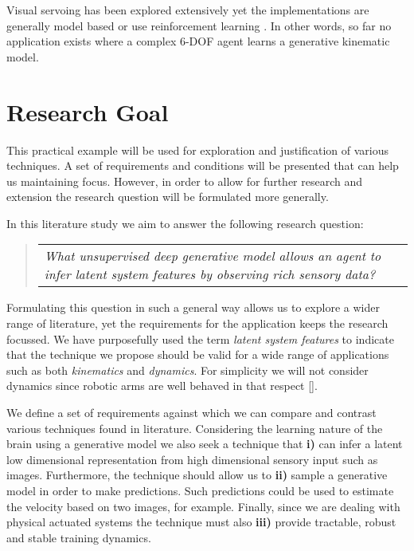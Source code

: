 \documentclass[main.tex]{subfiles}
\begin{document}
Visual servoing has been explored extensively yet the implementations are generally model based \cite{hosoda1994versatile} or use reinforcement learning \cite{levine2016learning}. In other words, so far no application exists where a complex 6-DOF agent learns a generative kinematic model.


\section{Research Goal}

This practical example will be used for exploration and justification of various techniques. A set of requirements and conditions will be presented that can help us maintaining focus. However, in order to allow for further research and extension the research question will be formulated more generally.

In this literature study we aim to answer the following research question: 
\begin{quotation}
\begin{tabular}{|p{10cm}}
\textit{What unsupervised deep generative model allows an agent to infer latent system features by observing rich sensory data?}
\end{tabular}
\end{quotation}

Formulating this question in such a general way allows us to explore a wider range of literature, yet the requirements for the application keeps the research focussed. We have purposefully used the term \textit{latent system features} to indicate that the technique we propose should be valid for a wide range of applications such as both \textit{kinematics} and \textit{dynamics}. For simplicity we will not consider dynamics since robotic arms are well behaved in that respect [].

We define a set of requirements against which we can compare and contrast various techniques found in literature. Considering the learning nature of the brain using a generative model we also seek a technique that \textbf{i)} can infer a latent low dimensional representation from high dimensional sensory input such as images. Furthermore, the technique should allow us to \textbf{ii)} sample a generative model in order to make predictions. Such predictions could be used to estimate the velocity based on two images, for example.
Finally, since we are dealing with physical actuated systems the technique must also \textbf{iii)} provide tractable, robust and stable training dynamics.
\end{document}
